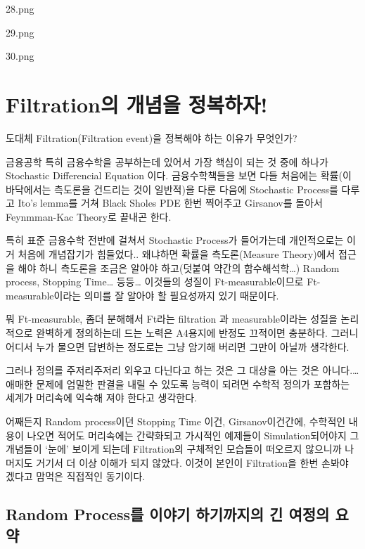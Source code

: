 \documentclass[
]{book}
\begin{document}
{{{28.png

29.png

30.png

\hypertarget{filtrationuxc758-uxac1cuxb150uxc744-uxc815uxbcf5uxd558uxc790}{%
\section{Filtration의 개념을 정복하자!}\label{filtrationuxc758-uxac1cuxb150uxc744-uxc815uxbcf5uxd558uxc790}}

도대체 Filtration(Filtration event)을 정복해야 하는 이유가 무엇인가?

금융공학 특히 금융수학을 공부하는데 있어서 가장 핵심이 되는 것 중에 하나가 Stochastic Differencial Equation 이다. 금융수학책들을 보면 다들 처음에는 확률(이 바닥에서는 측도론을 건드리는 것이 일반적)을 다룬 다음에 Stochastic Process를 다루고 Ito's lemma를 거쳐 Black Sholes PDE 한번 찍어주고 Girsanov를 돌아서 Feynmman-Kac Theory로 끝내곤 한다.

특히 표준 금융수학 전반에 걸쳐서 Stochastic Process가 들어가는데 개인적으로는 이거 처음에 개념잡기가 힘들었다.. 왜냐하면 확률을 측도론(Measure Theory)에서 접근을 해야 하니 측도론을 조금은 알아야 하고(덧붙여 약간의 함수해석학\ldots) Random process, Stopping Time\ldots{} 등등\ldots{} 이것들의 성질이 Ft-measurable이므로 Ft-measurable이라는 의미를 잘 알아야 할 필요성까지 있기 때문이다.

뭐 Ft-measurable, 좀더 분해해서 Ft라는 filtration 과 measurable이라는 성질을 논리적으로 완벽하게 정의하는데 드는 노력은 A4용지에 반정도 끄적이면 충분하다. 그러니 어디서 누가 물으면 답변하는 정도로는 그냥 암기해 버리면 그만이 아닐까 생각한다.

그러나 정의를 주저리주저리 외우고 다닌다고 하는 것은 그 대상을 아는 것은 아니다.\ldots{} 애매한 문제에 엄밀한 판결을 내릴 수 있도록 능력이 되려면 수학적 정의가 포함하는 세계가 머리속에 익숙해 져야 한다고 생각한다.

어째든지 Random process이던 Stopping Time 이건, Girsanov이건간에, 수학적인 내용이 나오면 적어도 머리속에는 간략화되고 가시적인 예제들이 Simulation되어야지 그 개념들이 `눈에' 보이게 되는데 Filtration의 구체적인 모습들이 떠오르지 않으니까 나머지도 거기서 더 이상 이해가 되지 않았다. 이것이 본인이 Filtration을 한번 손봐야 겠다고 맘먹은 직접적인 동기이다.

\hypertarget{random-processuxb97c-uxc774uxc57cuxae30-uxd558uxae30uxae4cuxc9c0uxc758-uxae34-uxc5ecuxc815uxc758-uxc694uxc57d}{%
\subsection{Random Process를 이야기 하기까지의 긴 여정의 요약}\label{random-processuxb97c-uxc774uxc57cuxae30-uxd558uxae30uxae4cuxc9c0uxc758-uxae34-uxc5ecuxc815uxc758-uxc694uxc57d}}

}}}
\end{document}
